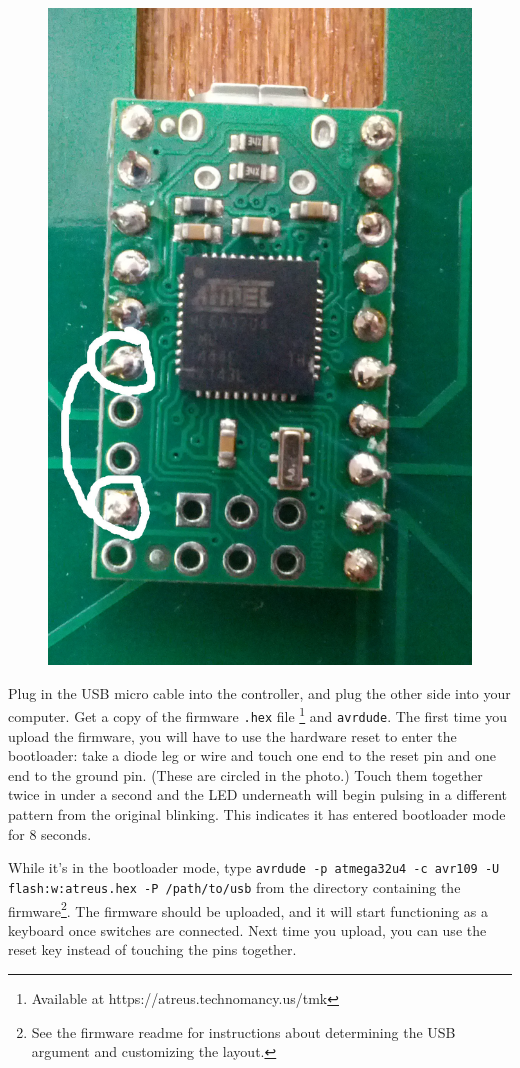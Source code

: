 \documentclass{article}
\begin{document}
\vspace{1em}

\begin{figure}
  \includegraphics[width=0.8\linewidth]{reset.jpg}
\end{figure}

Plug in the USB micro cable into the controller, and plug the other
side into your computer. Get a copy of the
firmware \texttt{.hex} file \footnote{Available at
  https://atreus.technomancy.us/tmk} and \texttt{avrdude}. The
first time you upload the firmware, you will have to use the hardware
reset to enter the bootloader: take a diode leg or wire and touch one
end to the reset pin and one end to the ground pin. (These are circled
in the photo.)  Touch them together twice in under a second and the
LED underneath will begin pulsing in a different pattern from the
original blinking. This indicates it has entered bootloader mode for 8
seconds.

\vspace{1em}

While it's in the bootloader mode, type \texttt{avrdude -p atmega32u4
  -c avr109 -U flash:w:atreus.hex -P /path/to/usb} from the directory
containing the firmware\footnote{See the firmware readme for
  instructions about determining the USB argument and customizing the
  layout.}. The firmware should be uploaded, and it will start
functioning as a keyboard once switches are connected. Next time you
upload, you can use the reset key instead of touching the pins
together.
\end{document}
